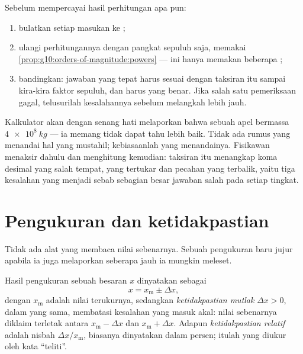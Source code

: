 \begin{method}\label{met:g10:orders-of-magnitude:sanity}
Sebelum mempercayai hasil perhitungan apa pun:
\begin{enumerate}
  \item bulatkan setiap masukan ke ;
  \item ulangi perhitungannya dengan pangkat sepuluh saja, memakai
        \cref{prop:g10:orders-of-magnitude:powers} --- ini hanya
        memakan beberapa ;
  \item bandingkan: jawaban yang tepat harus sesuai dengan taksiran itu
        sampai kira-kira faktor sepuluh, dan  harus 
        yang benar. Jika salah satu pemeriksaan gagal, telusurilah
        kesalahannya sebelum melangkah lebih jauh.
\end{enumerate}
\end{method}

\begin{remark}\label{rem:g10:orders-of-magnitude:sanity}
Kalkulator akan dengan senang hati melaporkan bahwa sebuah apel
bermassa $\qty{4e8}{kg}$ --- ia memang tidak dapat tahu lebih baik.
Tidak ada rumus yang menandai hal yang mustahil; kebiasaanlah yang
menandainya. Fisikawan menaksir dahulu dan menghitung kemudian:
taksiran itu menangkap koma desimal yang salah tempat,  yang
tertukar dan pecahan yang terbalik, yaitu tiga kesalahan yang menjadi
sebab sebagian besar jawaban salah pada setiap tingkat.
\end{remark}

\section{Pengukuran dan ketidakpastian}

Tidak ada alat yang membaca nilai sebenarnya. Sebuah pengukuran baru
jujur apabila ia juga melaporkan seberapa jauh ia mungkin meleset.

\begin{definition}\label{def:g10:orders-of-magnitude:uncertainty}
Hasil pengukuran sebuah besaran $x$ dinyatakan sebagai
\[
x = x_{\text{m}} \pm \Delta x ,
\]
dengan $x_{\text{m}}$ adalah nilai terukurnya, sedangkan
\emph{ketidakpastian mutlak}
$\Delta x > 0$, dalam  yang sama, membatasi kesalahan yang masuk
akal: nilai sebenarnya diklaim terletak antara
$x_{\text{m}} - \Delta x$ dan $x_{\text{m}} + \Delta x$. Adapun
\emph{ketidakpastian relatif} adalah
nisbah $\Delta x / x_{\text{m}}$, biasanya dinyatakan dalam persen;
itulah yang diukur oleh kata ``teliti''.
\end{definition}

